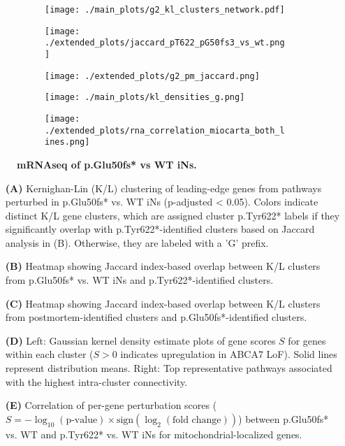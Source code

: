 \begin{figure}[H]
    \begin{subfigure}[t]{.3\textwidth}
        \caption{}
        \texttt{[image: ./main\_plots/g2\_kl\_clusters\_network.pdf]}        
    \end{subfigure}
    \begin{subfigure}[t]{.3\textwidth}
        \caption{}
        \texttt{[image: ./extended\_plots/jaccard\_pT622\_pG50fs3\_vs\_wt.png]}        
    \end{subfigure}
    \begin{subfigure}[t]{.3\textwidth}
        \caption{}
        \texttt{[image: ./extended\_plots/g2\_pm\_jaccard.png]}        
    \end{subfigure}
    \begin{subfigure}[t]{.6\textwidth}
        \caption{}
        \texttt{[image: ./main\_plots/kl\_densities\_g.png]}        
    \end{subfigure}
    \hspace{0.5cm}
    \begin{subfigure}[t]{.3\textwidth}
        \caption{}
        \texttt{[image: ./extended\_plots/rna\_correlation\_miocarta\_both\_lines.png]}        
    \end{subfigure}
    \caption{
        \textbf{mRNAseq of p.Glu50fs* vs WT iNs.}\\
    }
    \label{fig:bulk_RNAseq_supplement}
\end{figure}
\begin{itemize}
    \item[\textbf{(A)}] Kernighan-Lin (K/L) clustering of leading-edge genes from pathways perturbed in p.Glu50fs* vs. WT iNs (p-adjusted < 0.05). Colors indicate distinct K/L gene clusters, which are assigned cluster p.Tyr622* labels if they significantly overlap with p.Tyr622*-identified clusters based on Jaccard analysis in (B). Otherwise, they are labeled with a 'G' prefix.
    \item[\textbf{(B)}] Heatmap showing Jaccard index-based overlap between K/L clusters from p.Glu50fs* vs. WT iNs and p.Tyr622*-identified clusters.
    \item[\textbf{(C)}] Heatmap showing Jaccard index-based overlap between K/L clusters from postmortem-identified clusters and p.Glu50fs*-identified clusters.
    \item[\textbf{(D)}] Left: Gaussian kernel density estimate plots of gene scores $S$ for genes within each cluster ($S>0$ indicates upregulation in ABCA7 LoF). Solid lines represent distribution means. Right: Top representative pathways associated with the highest intra-cluster connectivity.
    \item[\textbf{(E)}] Correlation of per-gene perturbation scores ($S = -\log_{10}(\text{p-value}) \times \text{sign}(\log_2(\text{fold change}))$) between p.Glu50fs* vs. WT and p.Tyr622* vs. WT iNs for mitochondrial-localized genes.
\end{itemize}